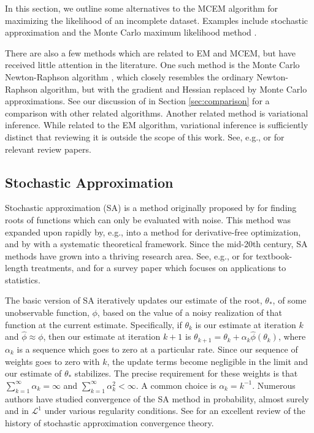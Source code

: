 \documentclass[ss]{imsart}
\theoremstyle{plain}
\theoremstyle{definition}
\theoremstyle{remark}
\begin{document}
In this section, we outline some alternatives to the MCEM algorithm for maximizing the likelihood of an incomplete dataset. Examples include stochastic approximation \citep{Del99, Rob51, Lai03} and the Monte Carlo maximum likelihood method \citep{Gel93, Gey94}. 

There are also a few methods which are related to EM and MCEM, but have received little attention in the literature. One such method is the Monte Carlo Newton-Raphson algorithm \citep{Kuk97}, which closely resembles the ordinary Newton-Raphson algorithm, but with the gradient and Hessian replaced by Monte Carlo approximations. See our discussion of \citet{McC97} in Section \ref{sec:comparison} for a comparison with other related algorithms. Another related method is variational inference. While related to the EM algorithm, variational inference is sufficiently distinct that reviewing it is outside the scope of this work. See, e.g., \citet{Ble17} or \citet{Tsi08} for relevant review papers.


\subsection{Stochastic Approximation}
\label{sec:SAEM}

Stochastic approximation (SA) is a method originally proposed by \citet{Rob51} for finding roots of functions which can only be evaluated with noise. This method was expanded upon rapidly by, e.g., \citet{Kie52} into a method for derivative-free optimization, and by \citet{Dvo56} with a systematic theoretical framework. Since the mid-20th century, SA methods have grown into a thriving research area. See, e.g., \citet{Kus97} or \citet{Bor22} for textbook-length treatments, and \citet{Lai03} for a survey paper which focuses on applications to statistics.

The basic version of SA iteratively updates our estimate of the root, $\theta_*$, of some unobservable function, $\phi$, based on the value of a noisy realization of that function at the current estimate. Specifically, if $\theta_k$ is our estimate at iteration $k$ and $\hat{\phi} \approx \phi$, then our estimate at iteration $k+1$ is $\theta_{k+1} = \theta_k + \alpha_k \hat{\phi}(\theta_k)$, where $\alpha_k$ is a sequence which goes to zero at a particular rate. Since our sequence of weights goes to zero with $k$, the update terms become negligible in the limit and our estimate of $\theta_*$ stabilizes. The precise requirement for these weights is that $\sum_{k=1}^\infty \alpha_k = \infty$ and $\sum_{k=1}^\infty \alpha_k^2 < \infty$. A common choice is $\alpha_k = k^{-1}$. Numerous authors have studied convergence of the SA method in probability, almost surely and in $\mathcal{L}^1$ under various regularity conditions. See \citet{Lai03} for an excellent review of the history of stochastic approximation convergence theory.
\end{document}
